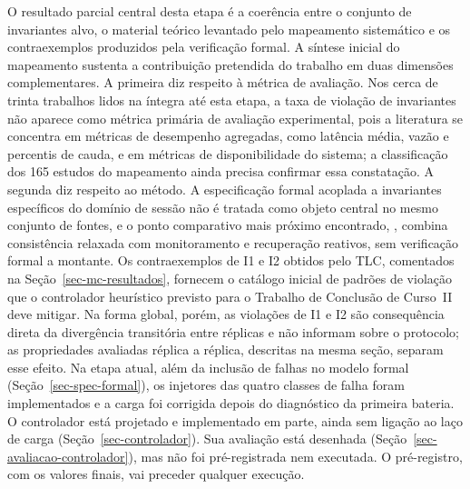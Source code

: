 O resultado parcial central desta etapa é a coerência entre o conjunto de invariantes alvo, o material teórico levantado pelo mapeamento sistemático e os contraexemplos produzidos pela verificação formal. A síntese inicial do mapeamento sustenta a contribuição pretendida do trabalho em duas dimensões complementares. A primeira diz respeito à métrica de avaliação. Nos cerca de trinta trabalhos lidos na íntegra até esta etapa, a taxa de violação de invariantes não aparece como métrica primária de avaliação experimental, pois a literatura se concentra em métricas de desempenho agregadas, como latência média, vazão e percentis de cauda, e em métricas de disponibilidade do sistema; a classificação dos 165 estudos do mapeamento ainda precisa confirmar essa constatação. A segunda diz respeito ao método. A especificação formal acoplada a invariantes específicos do domínio de sessão não é tratada como objeto central no mesmo conjunto de fontes, e o ponto comparativo mais próximo encontrado, \citet{nguyen_weaker_consistency_2019}, combina consistência relaxada com monitoramento e recuperação reativos, sem verificação formal a montante. Os contraexemplos de I1 e I2 obtidos pelo TLC, comentados na Seção~\ref{sec-mc-resultados}, fornecem o catálogo inicial de padrões de violação que o controlador heurístico previsto para o Trabalho de Conclusão de Curso~II deve mitigar. Na forma global, porém, as violações de I1 e I2 são consequência direta da divergência transitória entre réplicas e não informam sobre o protocolo; as propriedades avaliadas réplica a réplica, descritas na mesma seção, separam esse efeito. Na etapa atual, além da inclusão de falhas no modelo formal (Seção~\ref{sec-spec-formal}), os injetores das quatro classes de falha foram implementados e a carga foi corrigida depois do diagnóstico da primeira bateria. O controlador está projetado e implementado em parte, ainda sem ligação ao laço de carga (Seção~\ref{sec-controlador}). Sua avaliação está desenhada (Seção~\ref{sec-avaliacao-controlador}), mas não foi pré-registrada nem executada. O pré-registro, com os valores finais, vai preceder qualquer execução.

